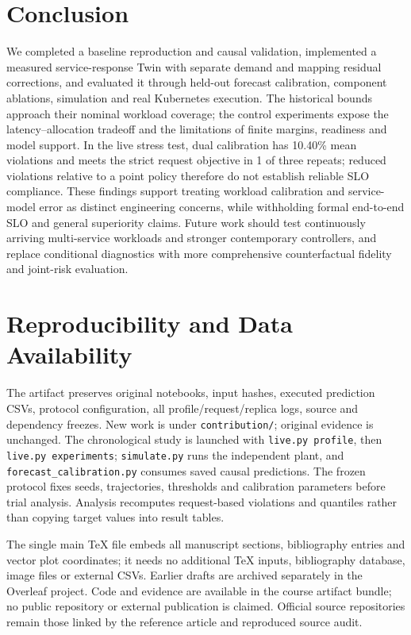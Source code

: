 \documentclass[11pt,a4paper]{article}
\begin{document}
\section{Conclusion}
We completed a baseline reproduction and causal validation, implemented a measured service-response Twin with separate demand and mapping residual corrections, and evaluated it through held-out forecast calibration, component ablations, simulation and real Kubernetes execution. The historical bounds approach their nominal workload coverage; the control experiments expose the latency--allocation tradeoff and the limitations of finite margins, readiness and model support. In the live stress test, dual calibration has 10.40\% mean violations and meets the strict request objective in 1 of three repeats; reduced violations relative to a point policy therefore do not establish reliable SLO compliance. These findings support treating workload calibration and service-model error as distinct engineering concerns, while withholding formal end-to-end SLO and general superiority claims. Future work should test continuously arriving multi-service workloads and stronger contemporary controllers, and replace conditional diagnostics with more comprehensive counterfactual fidelity and joint-risk evaluation.

\appendix
\section{Reproducibility and Data Availability}
The artifact preserves original notebooks, input hashes, executed prediction CSVs, protocol configuration, all profile/request/replica logs, source and dependency freezes. New work is under \texttt{contribution/}; original evidence is unchanged. The chronological study is launched with \texttt{live.py profile}, then \texttt{live.py experiments}; \texttt{simulate.py} runs the independent plant, and \texttt{forecast\_calibration.py} consumes saved causal predictions. The frozen protocol fixes seeds, trajectories, thresholds and calibration parameters before trial analysis. Analysis recomputes request-based violations and quantiles rather than copying target values into result tables.

The single main TeX file embeds all manuscript sections, bibliography entries and vector plot coordinates; it needs no additional TeX inputs, bibliography database, image files or external CSVs. Earlier drafts are archived separately in the Overleaf project. Code and evidence are available in the course artifact bundle; no public repository or external publication is claimed. Official source repositories remain those linked by the reference article and reproduced source audit.
\end{document}
